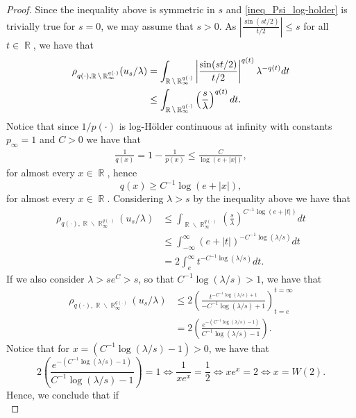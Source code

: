 \documentclass[11pt,reqno]{amsart}
\theoremstyle{definition}
\theoremstyle{definition}
\theoremstyle{definition}
\DeclareMathOperator{\R}{\mathbb{R}}
\newcommand{\p}{p(\cdot)}
\begin{document}
\begin{proof}
    Since the inequality above is symmetric in $s$ and \eqref{ineq_Psi_log-holder} is trivially true for $s=0$, we may assume that $s>0$. As $\left|\frac{\sin(st/2)}{t/2}\right|\leq s$ for all $t\in\R$, we have that
    \begin{align}
        \rho_{q(\cdot),\R\backslash\R_{\infty}^{q(\cdot)}}(u_s/\lambda)&=\int_{\R\backslash\R_{\infty}^{q(\cdot)}}\left|\frac{\sin(st/2)}{t/2}\right|^{q(t)}\lambda^{-q(t)}dt\notag\\
        &\leq \int_{\R\backslash\R_{\infty}^{q(\cdot)}}\left(\frac{s}{\lambda}\right)^{q(t)}dt.\label{ineq_general_tau_q}
    \end{align}
Notice that since $1/\p$ is log-Hölder continuous at infinity with constants $p_\infty=1$ and $C>0$ we have that
\begin{align*}
    \frac{1}{q(x)}=1-\frac{1}{p(x)}\leq \frac{C}{\log(e+|x|)},
\end{align*}
for almost every $x\in\R$, hence
\begin{equation*}
    q(x)\geq C^{-1}\log(e+|x|),
\end{equation*}
for almost every $x\in\R$.
Considering $\lambda> s$ by the inequality above we have that
    \begin{align*}
        \rho_{q(\cdot),\R\backslash\R_{\infty}^{q(\cdot)}}(u_s/\lambda)&\leq \int_{\R\backslash\R_{\infty}^{q(\cdot)}}\left(\frac{s}{\lambda}\right)^{C^{-1}\log(e+|t|)}dt\\
        &\leq\int_{-\infty}^{\infty}(e+|t|)^{-C^{-1}\log(\lambda/s)}dt\\
        &=2\int_e^{\infty}t^{-C^{-1}\log(\lambda/s)}dt.
    \end{align*}
    If we also consider $\lambda>se^{C}>s$, so that $C^{-1}\log(\lambda/s)>1$, we have that
   \begin{align*}
         \rho_{q(\cdot),\R\backslash\R_{\infty}^{q(\cdot)}}(u_s/\lambda)&\leq2\left(\frac{t^{-C^{-1}\log(\lambda/s)+1}}{-C^{-1}\log(\lambda/s)+1}\right)_{t=e}^{t=\infty}\\
         &=2\left(\frac{e^{-(C^{-1}\log(\lambda/s)-1)}}{C^{-1}\log(\lambda/s)-1}\right).
   \end{align*}
   Notice that for $x=(C^{-1}\log(\lambda/s)-1)>0$, we have that
   \begin{equation*}
       2\left(\frac{e^{-(C^{-1}\log(\lambda/s)-1)}}{C^{-1}\log(\lambda/s)-1}\right)=1\iff\frac{1}{xe^{x}}=\frac{1}{2}\iff xe^{x}=2\iff x=W(2).
   \end{equation*}
   Hence, we conclude that if 
   \begin{equation*}

\end{equation*}
\end{proof}
\end{document}
